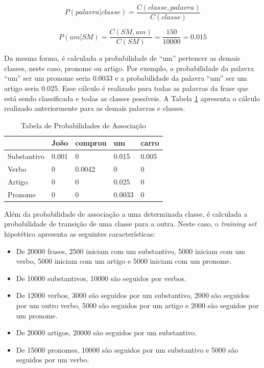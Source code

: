 \[ P(palavra|classe) = \frac{C(classe,palavra)}{C(classe)} \]

\[ P(um|SM) = \frac{C(SM,um)}{C(SM)} = \frac{150}{10000} = 0.015 \]

Da mesma forma, é calculada a probabilidade de ``um'' pertencer as demais
classes, neste caso, pronome ou artigo. Por exemplo, a probabilidade da palavra
``um'' ser um pronome seria 0.0033 e a probabilidade da palavra ``um'' ser um
artigo seria 0.025. Esse cálculo é realizado para todas as palavras da frase
que está sendo classificada e todas as classes possíveis. A Tabela
\ref{tabela:associacao} apresenta o cálculo realizado anteriormente para as
demais palavras e classes.

\begin{table}[htb]
\centering
\begin{tabular}{|l|l|l|l|l|}
\hline
& João  & comprou & um     & carro  \\ \hline
Substantivo & 0.001 & 0       & 0.015  & 0.005  \\ \hline
Verbo       & 0     & 0.0042  & 0      & 0      \\ \hline
Artigo      & 0     & 0       & 0.025  & 0      \\ \hline
Pronome     & 0     & 0       & 0.0033 & 0      \\ \hline
\end{tabular}
\caption{Tabela de Probabilidades de Associação}
\label{tabela:associacao}
\end{table}

Além da probabilidade de associação a uma determinada classe, é calculada a
probabilidade de transição de uma classe para a outra. Neste caso, o
\textit{training set} hipotético apresenta as seguintes características:

\begin{itemize}
  \item De 20000 frases, 2500 iniciam com um substantivo, 5000 iniciam com um
  verbo, 5000 iniciam com um artigo e 5000 iniciam com um pronome.
  \item De 10000 substantivos, 10000
  são seguidos por verbos.
  \item De 12000 verbos, 3000 são seguidos por um substantivo, 2000
  são seguidos por um outro verbo, 5000 são seguidos por um artigo e 2000 são
  seguidos por um pronome.
  \item De 20000 artigos, 20000 são seguidos por um substantivo.
  \item De 15000 pronomes, 10000 são seguidos por um substantivo e 5000 são
  seguidos por um verbo.
  
  
\end{itemize}


